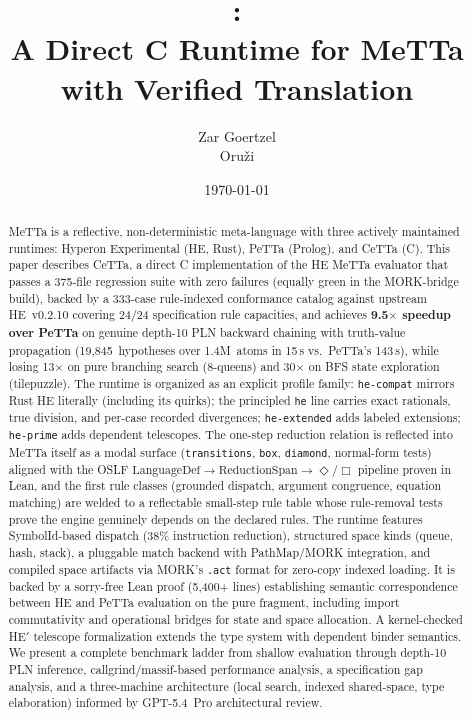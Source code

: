 \documentclass[11pt]{article}
\title{\CeTTa{}:\\
\large A Direct C Runtime for MeTTa with Verified Translation}
\author{Zar Goertzel\\Oru\v{z}i}
\date{\today}
\newcommand{\code}[1]{\texttt{#1}}
\newcommand{\PeTTa}{\textup{PeTTa}}
\newcommand{\HE}{\textup{HE}}
\newcommand{\CeTTa}{\textup{CeTTa}}
\begin{document}
\maketitle

\begin{abstract}
MeTTa is a reflective, non-deterministic meta-language with three
actively maintained runtimes: Hyperon Experimental (\HE{}, Rust),
\PeTTa{} (Prolog), and \CeTTa{} (C).  This paper describes \CeTTa{},
a direct C implementation of the \HE{} MeTTa evaluator that passes a
375-file regression suite with zero failures (equally green in the
MORK-bridge build), backed by a 333-case rule-indexed conformance
catalog against upstream \HE{}~v0.2.10 covering 24/24 specification
rule capacities, and achieves \textbf{9.5$\times$ speedup over
\PeTTa{}} on genuine depth-10 PLN backward chaining with truth-value
propagation (19{,}845~hypotheses over 1.4M~atoms in 15\,s vs.\
\PeTTa{}'s 143\,s), while losing 13$\times$ on pure branching search
(8-queens) and 30$\times$ on BFS state exploration (tilepuzzle).
The runtime is organized as an explicit profile family:
\code{he-compat} mirrors Rust \HE{} literally (including its quirks);
the principled \code{he} line carries exact rationals, true division,
and per-case recorded divergences; \code{he-extended} adds labeled
extensions; \code{he-prime} adds dependent telescopes.  The one-step
reduction relation is reflected into MeTTa itself as a modal surface
(\code{transitions}, \code{box}, \code{diamond}, normal-form tests)
aligned with the OSLF
$\mathrm{LanguageDef}\to\mathrm{ReductionSpan}\to\Diamond/\Box$
pipeline proven in Lean, and the first rule classes (grounded dispatch,
argument congruence, equation matching) are welded to a reflectable
small-step rule table whose rule-removal tests prove the engine
genuinely depends on the declared rules.
The runtime features SymbolId-based dispatch (38\% instruction
reduction), structured space kinds (queue, hash, stack), a pluggable
match backend with PathMap/MORK integration, and compiled space
artifacts via MORK's \code{.act} format for zero-copy indexed loading.
It is backed by a sorry-free Lean proof (5{,}400+ lines) establishing
semantic correspondence between \HE{} and \PeTTa{} evaluation on the
pure fragment, including import commutativity and operational bridges
for state and space allocation.  A kernel-checked HE$'$ telescope
formalization extends the type system with dependent binder semantics.
We present a complete benchmark ladder from shallow evaluation through
depth-10 PLN inference, callgrind/massif-based performance analysis,
a specification gap analysis, and a three-machine architecture (local
search, indexed shared-space, type elaboration) informed by GPT-5.4~Pro
architectural review.
\end{abstract}
\end{document}
